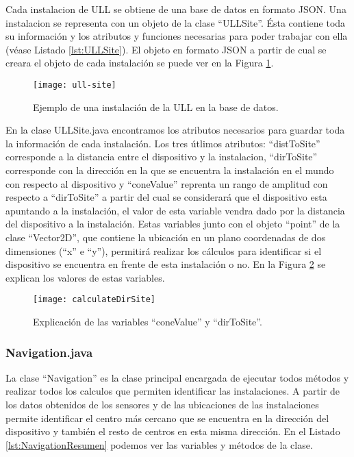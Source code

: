 Cada instalacion de ULL se obtiene de una base de datos en formato JSON. Una instalacion se representa con un objeto de la clase ``ULLSite''. Ésta contiene toda su información y los atributos y funciones necesarias para poder trabajar con ella (véase Listado \ref{lst:ULLSite}). El objeto en formato JSON a partir de cual se creara el objeto de cada instalación se puede ver en la Figura \ref{fig:ull-site}.



\begin{figure}[h] 
    \centering
    \texttt{[image: ull-site]}
    \caption{Ejemplo de una instalación de la ULL en la base de datos.}
    \label{fig:ull-site}
\end{figure}

En la clase ULLSite.java encontramos los atributos necesarios para guardar toda la información de cada instalación. Los tres útlimos atributos:  ``distToSite'' corresponde a la distancia entre el dispositivo y la instalacion, ``dirToSite'' corresponde con la dirección en la que se encuentra la instalación en el mundo con respecto al dispositivo y ``coneValue'' reprenta un rango de amplitud  con respecto a ``dirToSite'' a partir del cual se considerará que el dispositivo esta apuntando a la instalación, el valor de esta variable vendra dado por la distancia del dispositivo a la instalación. Estas variables junto con el objeto ``point'' de la clase ``Vector2D'', que contiene la ubicación en un plano coordenadas de dos dimensiones (``x'' e ``y''), permitirá realizar los cálculos para identificar si el dispositivo se encuentra en frente de esta instalación o no. En la Figura \ref{fig:dirSite} se explican los valores de estas variables.

\begin{figure}[h] 
    \centering
    \texttt{[image: calculateDirSite]}
    \caption{Explicación de las variables ``coneValue'' y ``dirToSite''.}
    \label{fig:dirSite}
\end{figure}

  
\subsubsection{Navigation.java}

La clase ``Navigation'' es la clase principal encargada de  ejecutar todos métodos y realizar todos los calculos que permiten identificar las instalaciones. A partir de los datos obtenidos de los sensores y de las ubicaciones de las instalaciones permite identificar el centro más cercano que se encuentra en la dirección del dispositivo y también el resto de centros en esta misma dirección. En el Listado \ref{lst:NavigationResumen} podemos ver las variables y métodos de la clase.

